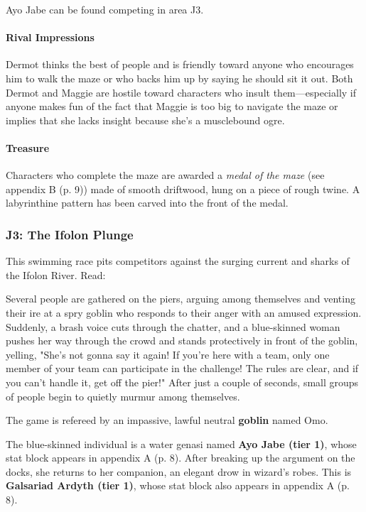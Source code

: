 \documentclass[letterpaper, 11pt, bg=full, twocolumn]{dndbook}
\begin{document}

Ayo Jabe can be found competing in area J3.

\paragraph{Rival Impressions}

Dermot thinks the best of people and is friendly toward anyone who encourages him to walk the maze or who backs him up by saying he should sit it out. Both Dermot and Maggie are hostile toward characters who insult them---especially if anyone makes fun of the fact that Maggie is too big to navigate the maze or implies that she lacks insight because she's a musclebound ogre.

\paragraph{Treasure}

Characters who complete the maze are awarded a \textit{medal of the maze} (see appendix B (p. 9)) made of smooth driftwood, hung on a piece of rough twine. A labyrinthine pattern has been carved into the front of the medal.

\subsubsection{J3: The Ifolon Plunge}

This swimming race pits competitors against the surging current and sharks of the Ifolon River. Read:

\begin{DndReadAloud}
Several people are gathered on the piers, arguing among themselves and venting their ire at a spry goblin who responds to their anger with an amused expression. Suddenly, a brash voice cuts through the chatter, and a blue-skinned woman pushes her way through the crowd and stands protectively in front of the goblin, yelling, "She's not gonna say it again! If you're here with a team, only one member of your team can participate in the challenge! The rules are clear, and if you can't handle it, get off the pier!" After just a couple of seconds, small groups of people begin to quietly murmur among themselves.
\end{DndReadAloud}

The game is refereed by an impassive, lawful neutral \textbf{goblin} named Omo.

The blue-skinned individual is a water genasi named \textbf{Ayo Jabe (tier 1)}, whose stat block appears in appendix A (p. 8). After breaking up the argument on the docks, she returns to her companion, an elegant drow in wizard's robes. This is \textbf{Galsariad Ardyth (tier 1)}, whose stat block also appears in appendix A (p. 8).
\end{document}
